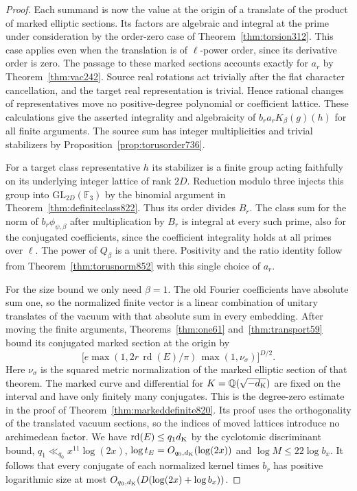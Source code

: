 \documentclass[a4paper,11pt]{article}
\theoremstyle{definition}
\theoremstyle{remark}
\numberwithin{equation}{section}
\begin{document}
\begin{proof}
Each summand is now the value at the origin of a translate of
the product of marked elliptic sections. Its factors are
algebraic and integral at the prime under consideration by
the order-zero case of Theorem~\ref{thm:torsion312}. This
case applies even when the translation is of \(\ell\)-power
order, since its derivative order is zero. The passage to
these marked sections accounts exactly for \(a_r\) by
Theorem~\ref{thm:vac242}. Source real rotations act trivially
after the flat character cancellation, and the target real
representation is trivial. Hence rational changes of representatives
move no positive-degree polynomial or coefficient lattice. These
calculations give the asserted integrality and algebraicity of
\(b_r a_r K_\beta(g)(h)\) for all finite arguments. The source
sum has integer multiplicities and trivial stabilizers by
Proposition~\ref{prop:torusorder736}.

For a target class representative \(h\) its stabilizer is
a finite group acting faithfully on its underlying integer
lattice of rank \(2D\). Reduction modulo three injects this
group into \(\mathrm{GL}_{2D}(\mathbb F_3)\) by the binomial
argument in Theorem~\ref{thm:definiteclass822}. Thus its
order divides \(B_r\). The class sum for the norm of
\(b_r\phi_{\psi,\beta}\) after multiplication by \(B_r\)
is integral at every such prime, also for the conjugated
coefficients, since the coefficient integrality holds at
all primes over \(\ell\). The power of \(Q_\beta\) is a unit
there. Positivity and the ratio identity follow from
Theorem~\ref{thm:torusnorm852} with this single choice of \(a_r\).

For the size bound we only need \(\beta=1\). The old Fourier
coefficients have absolute sum one, so the normalized finite
vector is a linear combination of unitary translates of the
vacuum with that absolute sum in every embedding. After
moving the finite arguments, Theorems~\ref{thm:one61}
and~\ref{thm:transport59} bound its conjugated marked section
at the origin by
\[
  \bigl[e\max(1,2r\,\operatorname{rd}(E)/\pi)\,
                 \max(1,\nu_\sigma)\bigr]^{D/2}.
\]
Here \(\nu_\sigma\) is the squared metric normalization of
the marked elliptic section of that theorem. The marked curve
and differential for \(K=\mathbb Q(\sqrt{-d_{\rm K}})\) are
fixed on the interval and have only finitely many conjugates.
This is the degree-zero estimate in the proof of
Theorem~\ref{thm:markeddefinite820}. Its proof uses the
orthogonality of the translated vacuum sections, so the
indices of moved lattices introduce no archimedean factor.
We have \(\operatorname{rd}(E)\le q_1d_{\rm K}\) by the
cyclotomic discriminant bound, \(q_1\ll_{q_0}x^{11}\log(2x)\),
\(\log t_E=O_{q_0,d_{\rm K}}(\log(2x))\) and
\(\log M\le22\log b_x\). It follows that every conjugate of
each normalized kernel times \(b_r\) has positive logarithmic
size at most \(O_{q_0,d_{\rm K}}(D(\log(2x)+\log b_x))\).


\end{proof}
\end{document}
